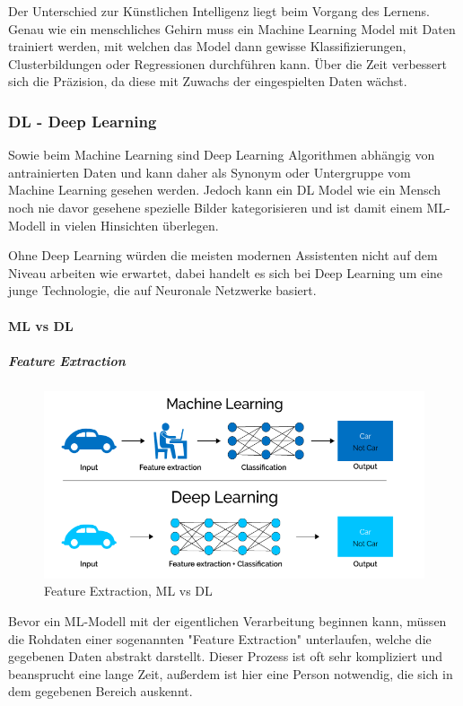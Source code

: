 Der Unterschied zur Künstlichen Intelligenz liegt beim Vorgang des Lernens. Genau wie ein menschliches Gehirn muss ein Machine Learning Model mit Daten trainiert werden, mit welchen das Model dann gewisse Klassifizierungen, Clusterbildungen oder Regressionen durchführen kann. Über die Zeit verbessert sich die Präzision, da diese mit Zuwachs der eingespielten Daten wächst.

\subsubsection{DL - Deep Learning}

Sowie beim Machine Learning sind Deep Learning Algorithmen abhängig von antrainierten Daten und kann daher als Synonym oder Untergruppe vom Machine Learning gesehen werden. Jedoch kann ein DL Model wie ein Mensch noch nie davor gesehene spezielle Bilder kategorisieren und ist damit einem ML-Modell in vielen Hinsichten überlegen. 

Ohne Deep Learning würden die meisten modernen Assistenten nicht auf dem Niveau arbeiten wie erwartet, dabei handelt es sich bei Deep Learning um eine junge Technologie, die auf Neuronale Netzwerke basiert.

\paragraph{ML vs DL}

\subparagraph{Feature Extraction}

\begin{figure}[h]
    \centering
    \includegraphics[scale=0.6]{sections/machine-learning/images/MLvsDL.png}
    \caption{Feature Extraction, ML vs DL}
    \label{fig:kimldl-comparison}
\end{figure}

Bevor ein ML-Modell mit der eigentlichen Verarbeitung beginnen kann, müssen die Rohdaten einer sogenannten "Feature Extraction" unterlaufen, welche die gegebenen Daten abstrakt darstellt. Dieser Prozess ist oft sehr kompliziert und beansprucht eine lange Zeit, außerdem ist hier eine Person notwendig, die sich in dem gegebenen Bereich auskennt.

